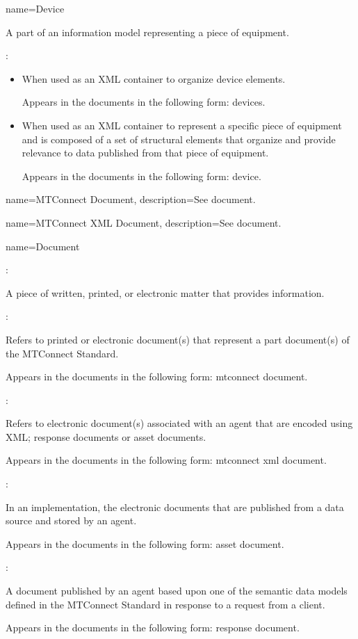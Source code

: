 {
  name={Device}
}
{
	A part of an information model representing a piece of equipment.  
	
	:

    \begin{itemize}
	\item When used as an XML container to organize \gls{device} elements.

	Appears in the documents in the following form: \gls{devices}.

	\item When used as an XML container to represent a specific piece of equipment and is composed of a set of \glspl{structural element} that organize and provide relevance to data published from that piece of equipment.

	Appears in the documents in the following form: \gls{device}.
	\end{itemize}
}


{
  name={MTConnect Document},
  description={See \gls{document}.}
}

{
  name={MTConnect XML Document},
  description={See \gls{document}.}
}


{
  name={Document}
}
{
	:

	A piece of written, printed, or electronic matter that provides information.

	:

	Refers to printed or electronic document(s) that represent a \gls{part document}(s) of the MTConnect Standard.

	Appears in the documents in the following form: \gls{mtconnect document}.

	:

	Refers to electronic document(s) associated with an \gls{agent} that are encoded using XML; \glspl{response document} or \glspl{asset document}.

	Appears in the documents in the following form: \gls{mtconnect xml document}.

	:

	In an implementation, the electronic documents that are published from a data source and stored by an \gls{agent}.

	Appears in the documents in the following form: \gls{asset document}.

	:

	A document published by an \gls{agent} based upon one of the \glspl{semantic data model} defined in the MTConnect Standard in response to a request from a client.  

	Appears in the documents in the following form: \gls{response document}.
}


